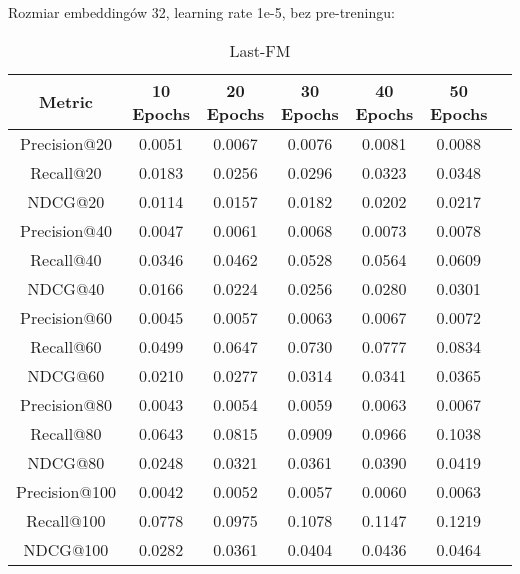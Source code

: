 \documentclass[a4paper]{LTJournalArticle}
\begin{document}
	Rozmiar embeddingów 32, learning rate 1e-5, bez pre-treningu:
	\begin{table}[h]
		\centering
		\caption{Last-FM}
		\label{tab:metrics_transposed}
		\scriptsize %
		\begin{tabular}{ccccccc}
			\toprule
			Metric & 10 Epochs & 20 Epochs & 30 Epochs & 40 Epochs & 50 Epochs \\
			\midrule
			Precision@20  & 0.0051  & 0.0067  & 0.0076  & 0.0081  & 0.0088  \\
			Recall@20     & 0.0183  & 0.0256  & 0.0296  & 0.0323  & 0.0348  \\
			NDCG@20       & 0.0114  & 0.0157  & 0.0182  & 0.0202  & 0.0217  \\
			Precision@40  & 0.0047  & 0.0061  & 0.0068  & 0.0073  & 0.0078  \\
			Recall@40     & 0.0346  & 0.0462  & 0.0528  & 0.0564  & 0.0609  \\
			NDCG@40       & 0.0166  & 0.0224  & 0.0256  & 0.0280  & 0.0301  \\
			Precision@60  & 0.0045  & 0.0057  & 0.0063  & 0.0067  & 0.0072  \\
			Recall@60     & 0.0499  & 0.0647  & 0.0730  & 0.0777  & 0.0834  \\
			NDCG@60       & 0.0210  & 0.0277  & 0.0314  & 0.0341  & 0.0365  \\
			Precision@80  & 0.0043  & 0.0054  & 0.0059  & 0.0063  & 0.0067  \\
			Recall@80     & 0.0643  & 0.0815  & 0.0909  & 0.0966  & 0.1038  \\
			NDCG@80       & 0.0248  & 0.0321  & 0.0361  & 0.0390  & 0.0419  \\
			Precision@100 & 0.0042  & 0.0052  & 0.0057  & 0.0060  & 0.0063  \\
			Recall@100    & 0.0778  & 0.0975  & 0.1078  & 0.1147  & 0.1219  \\
			NDCG@100      & 0.0282  & 0.0361  & 0.0404  & 0.0436  & 0.0464  \\
			\bottomrule
		\end{tabular}
	\end{table}
	
\end{document}
